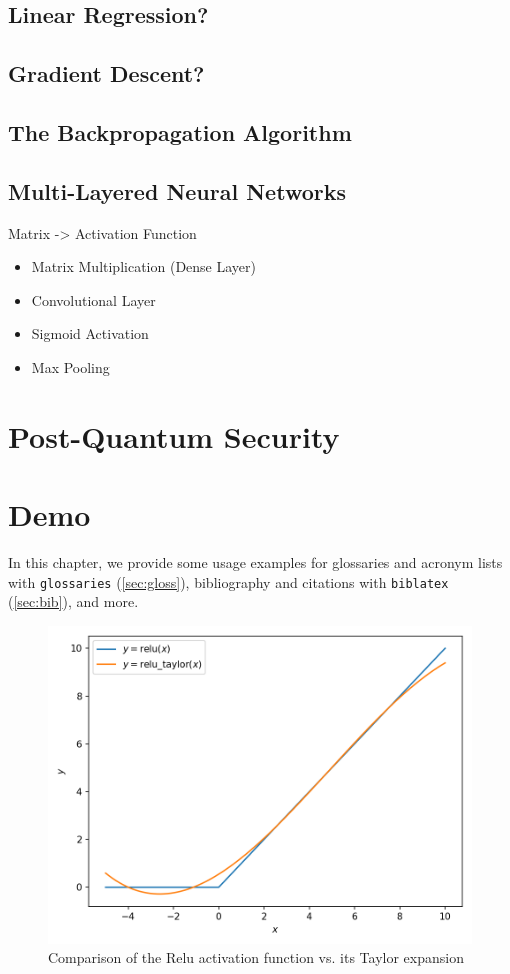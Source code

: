 \subsection{Linear Regression?}
\subsection{Gradient Descent?}
\subsection{The Backpropagation Algorithm}
\subsection{Multi-Layered Neural Networks}
Matrix -> Activation Function
\begin{itemize}
  \item Matrix Multiplication (Dense Layer)
  \item Convolutional Layer
  \item Sigmoid Activation
  \item Max Pooling
\end{itemize}

\section{Post-Quantum Security}

\section{Demo}
In this chapter, we provide some usage examples for
glossaries and acronym lists with \texttt{glossaries} (\autoref{sec:gloss}),
bibliography and citations with \texttt{biblatex} (\autoref{sec:bib}), and more.

\begin{figure}[H]
  \centering
  \includegraphics[width=0.8\linewidth]{figures/taylor-relu.png}
  \caption{Comparison of the Relu activation function vs. its Taylor expansion}
\end{figure}

